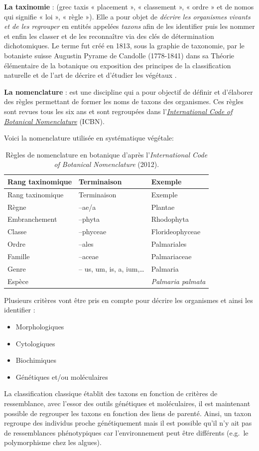 \documentclass[
]{book}
\providecommand{\tightlist}{%
  \setlength{\itemsep}{0pt}\setlength{\parskip}{0pt}}
\begin{document}
\textbf{La taxinomie} : (grec taxis « placement », « classement », « ordre » et de nomos qui signifie « loi », « règle »). Elle a pour objet de \emph{décrire les organismes vivants et de les regrouper} en entités appelées \emph{taxons} afin de les identifier puis les nommer et enfin les classer et de les reconnaître via des clés de détermination dichotomiques. Le terme fut créé en 1813, sous la graphie de taxonomie, par le botaniste suisse Augustin Pyrame de Candolle (1778-1841) dans sa Théorie élémentaire de la botanique ou exposition des principes de la classification naturelle et de l'art de décrire et d'étudier les végétaux \citep{de1844}.

\textbf{La nomenclature} : est une discipline qui a pour objectif de définir et d'élaborer des règles permettant de former les noms de taxons des organismes. Ces règles sont revues tous les six ans et sont regroupées dans l'\href{http://iapt-taxon.org/nomen/main.php}{\emph{International Code of Botanical Nomenclature}} (ICBN).

Voici la nomenclature utilisée en systématique végétale:

\begin{longtable}[]{@{}lll@{}}
\caption{Règles de nomenclature en botanique d'après l'\emph{International Code of Botanical Nomenclature} (2012).}\tabularnewline
\toprule
Rang taxinomique & Terminaison & Exemple\tabularnewline
\midrule
\endfirsthead
\toprule
Rang taxinomique & Terminaison & Exemple\tabularnewline
\midrule
\endhead
Règne & --ae/a & Plantae\tabularnewline
Embranchement & --phyta & Rhodophyta\tabularnewline
Classe & --phyceae & Florideophyceae\tabularnewline
Ordre & --ales & Palmariales\tabularnewline
Famille & --aceae & Palmariaceae\tabularnewline
Genre & -- us, um, is, a, ium,\ldots{} & Palmaria\tabularnewline
Espèce & & \emph{Palmaria palmata}\tabularnewline
\bottomrule
\end{longtable}

Plusieurs critères vont être pris en compte pour décrire les organismes et ainsi les identifier :

\begin{itemize}
\tightlist
\item
  Morphologiques
\item
  Cytologiques
\item
  Biochimiques
\item
  Génétiques et/ou moléculaires
\end{itemize}

La classification classique établit des taxons en fonction de critères de ressemblance, avec l'essor des outils génétiques et moléculaires, il est maintenant possible de regrouper les taxons en fonction des liens de parenté. Ainsi, un taxon regroupe des individus proche génétiquement mais il est possible qu'il n'y ait pas de ressemblances phénotypiques car l'environnement peut être différents (e.g.~le polymorphisme chez les algues).
\end{document}
